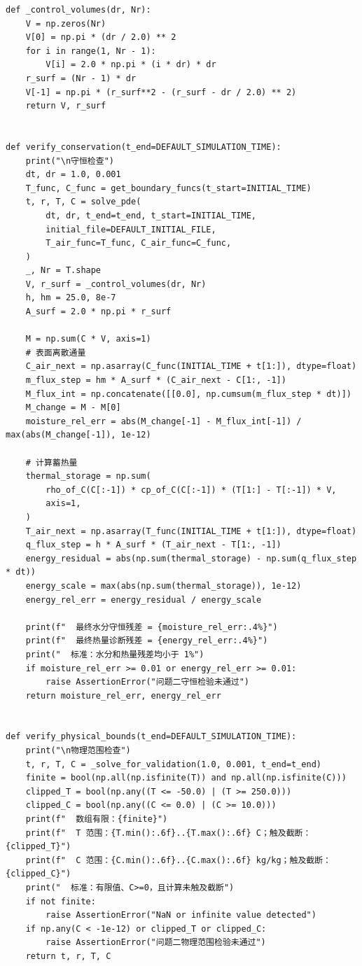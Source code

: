 \documentclass[withoutpreface,bwprint]{cumcm_thesis}
\begin{document}
\begin{appendices}
\begin{lstlisting}
def _control_volumes(dr, Nr):
    V = np.zeros(Nr)
    V[0] = np.pi * (dr / 2.0) ** 2
    for i in range(1, Nr - 1):
        V[i] = 2.0 * np.pi * (i * dr) * dr
    r_surf = (Nr - 1) * dr
    V[-1] = np.pi * (r_surf**2 - (r_surf - dr / 2.0) ** 2)
    return V, r_surf


def verify_conservation(t_end=DEFAULT_SIMULATION_TIME):
    print("\n守恒检查")
    dt, dr = 1.0, 0.001
    T_func, C_func = get_boundary_funcs(t_start=INITIAL_TIME)
    t, r, T, C = solve_pde(
        dt, dr, t_end=t_end, t_start=INITIAL_TIME,
        initial_file=DEFAULT_INITIAL_FILE,
        T_air_func=T_func, C_air_func=C_func,
    )
    _, Nr = T.shape
    V, r_surf = _control_volumes(dr, Nr)
    h, hm = 25.0, 8e-7
    A_surf = 2.0 * np.pi * r_surf

    M = np.sum(C * V, axis=1)
    # 表面离散通量
    C_air_next = np.asarray(C_func(INITIAL_TIME + t[1:]), dtype=float)
    m_flux_step = hm * A_surf * (C_air_next - C[1:, -1])
    M_flux_int = np.concatenate([[0.0], np.cumsum(m_flux_step * dt)])
    M_change = M - M[0]
    moisture_rel_err = abs(M_change[-1] - M_flux_int[-1]) / max(abs(M_change[-1]), 1e-12)

    # 计算蓄热量
    thermal_storage = np.sum(
        rho_of_C(C[:-1]) * cp_of_C(C[:-1]) * (T[1:] - T[:-1]) * V,
        axis=1,
    )
    T_air_next = np.asarray(T_func(INITIAL_TIME + t[1:]), dtype=float)
    q_flux_step = h * A_surf * (T_air_next - T[1:, -1])
    energy_residual = abs(np.sum(thermal_storage) - np.sum(q_flux_step * dt))
    energy_scale = max(abs(np.sum(thermal_storage)), 1e-12)
    energy_rel_err = energy_residual / energy_scale

    print(f"  最终水分守恒残差 = {moisture_rel_err:.4%}")
    print(f"  最终热量诊断残差 = {energy_rel_err:.4%}")
    print("  标准：水分和热量残差均小于 1%")
    if moisture_rel_err >= 0.01 or energy_rel_err >= 0.01:
        raise AssertionError("问题二守恒检验未通过")
    return moisture_rel_err, energy_rel_err


def verify_physical_bounds(t_end=DEFAULT_SIMULATION_TIME):
    print("\n物理范围检查")
    t, r, T, C = _solve_for_validation(1.0, 0.001, t_end=t_end)
    finite = bool(np.all(np.isfinite(T)) and np.all(np.isfinite(C)))
    clipped_T = bool(np.any((T <= -50.0) | (T >= 250.0)))
    clipped_C = bool(np.any((C <= 0.0) | (C >= 10.0)))
    print(f"  数组有限：{finite}")
    print(f"  T 范围：{T.min():.6f}..{T.max():.6f} C；触及截断：{clipped_T}")
    print(f"  C 范围：{C.min():.6f}..{C.max():.6f} kg/kg；触及截断：{clipped_C}")
    print("  标准：有限值、C>=0，且计算未触及截断")
    if not finite:
        raise AssertionError("NaN or infinite value detected")
    if np.any(C < -1e-12) or clipped_T or clipped_C:
        raise AssertionError("问题二物理范围检验未通过")
    return t, r, T, C



\end{lstlisting}
\end{appendices}
\end{document}
